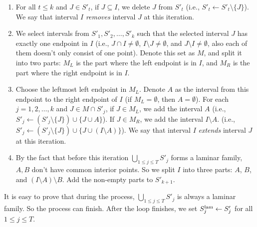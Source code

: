 \documentclass[11pt,a4paper]{article} \usepackage{enumitem}
\newcommand{\lamS}[1]{\ifx\relax#1\relax
    S^{\operatorname{lam}}
  \else
    S^{\operatorname{lam}}_{#1} 
  \fi
}
\theoremstyle{definition}
\begin{document}
\begin{enumerate}
\item For all $t \leq k$ and $J \in S'_t$, if $J \subseteq I$, we delete $J$ from $S'_t$ (i.e., $S'_t \gets S'_t \setminus \{J\}$). We say that interval $I$ \emph{removes} interval $J$ at this iteration.

\item We select intervals from $S'_1, S'_2, \dots, S'_k$ such that the selected interval $J$ has exactly one endpoint in $I$ (i.e., $J \cap I \neq \emptyset$, $I \setminus J \neq \emptyset$, and $J \setminus I \neq \emptyset$, also each of them doesn't only consist of one point). Denote this set as $M$, and split it into two parts: $M_L$ is the part where the left endpoint is in $I$, and $M_R$ is the part where the right endpoint is in $I$.

\item Choose the leftmost left endpoint in $M_L$. Denote $A$ as the interval from this endpoint to the right endpoint of $I$ (if $M_L = \emptyset$, then $A = \emptyset$). 
For each $j = 1, 2, \ldots, k$ and $J \in M \cap S'_j$, 
if $J \in M_L$, we add the interval $A$ (i.e., $S'_j \gets (S'_j \setminus \{J\}) \cup \{J \cup A\}$).
If $J \in M_R$, we add the interval $I\setminus A$. (i.e., $S'_j \gets (S'_j \setminus \{J\}) \cup \{J \cup (I\setminus A)\}$).
We say that interval $I$ \emph{extends} interval $J$ at this iteration.

\item By the fact that before this iteration $\bigcup_{1 \leq j \leq T} S'_j$ forms a laminar family, $A,B$ don't have common interior points. So we split $I$ into three parts: $A$, $B$, and $(I \setminus A) \setminus B$. Add the non-empty parts to $S'_{k+1}$.
\end{enumerate}

It is easy to prove that during the process, $\bigcup_{1 \leq j \leq T} S'_j$ is always a laminar family. So the process can finish.
After the loop finishes, we set $\lamS{j} \gets S'_j$ for all $1 \leq j \leq T$.
\end{document}
